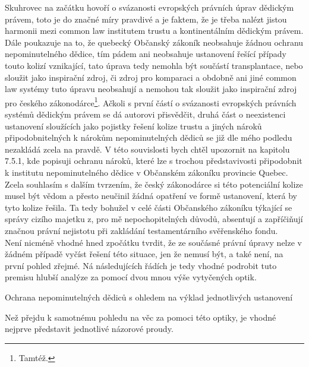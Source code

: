 \documentclass{article}
\begin{document}
Skuhrovec na začátku hovoří o svázanosti evropských právních úprav dědickým právem, toto je do značné míry pravdivé a je faktem, že je třeba nalézt jistou harmonii mezi common law institutem trustu a kontinentálním dědickým právem. Dále poukazuje na to, že quebecký Občanský zákoník neobsahuje žádnou ochranu nepominutelného dědice, tím pádem ani neobsahuje ustanovení řešící případy touto kolizí vznikající, tato úprava tedy nemohla být součástí transplantace, nebo sloužit jako inspirační zdroj, či zdroj pro komparaci a obdobně ani jiné common law systémy tuto úpravu neobsahují a nemohou tak sloužit jako inspirační zdroj pro českého zákonodárce\footnote{Tamtéž.}. Ačkoli s první částí o svázanosti evropských právních systémů dědickým právem se dá autorovi přisvědčit, druhá část o neexistenci ustanovení sloužících jako pojistky řešení kolize trustu a jiných nároků připodobnitelných k nárokům nepominutelných dědiců se již dle mého podledu nezakládá zcela na pravdě. V této souvislosti bych chtěl upozornit na kapitolu 7.5.1, kde popisuji ochranu nároků, které lze s trochou představivosti připodobnit k institutu nepominutelného dědice v Občanském zákoníku provincie Quebec.\\

Zcela souhlasím s dalším tvrzením, že český zákonodárce si této potenciální kolize musel být vědom a přesto neučinil žádná opatření ve formě ustanovení, která by tyto kolize řešila. Ta tedy bohužel v celé části Občanského zákoníku týkající se správy cizího majetku z, pro mě nepochopitelných důvodů, absentují a zapříčiňují značnou právní nejistotu při zakládání testamentárního svěřenského fondu.\\

Není nicméně vhodné hned zpočátku tvrdit, že ze součásné právní úpravy nelze v žádném případě vyčíst řešení této situace, jen že nemusí být, a také není, na první pohled zřejmé. Ná následujících řádích je tedy vhodné podrobit tuto premisu hlubší analýze za pomocí dvou mnou výše vytyčených optik.\\

   \begin{enumerate}
 {\Large\item[1.] Ochrana nepominutelných dědiců s ohledem na výklad jednotlivých ustanovení}
 \end{enumerate}
 
 Než přejdu k samotnému pohledu na věc za pomoci této optiky, je vhodné nejprve představit jednotlivé názorové proudy.\\
 
\end{document}
